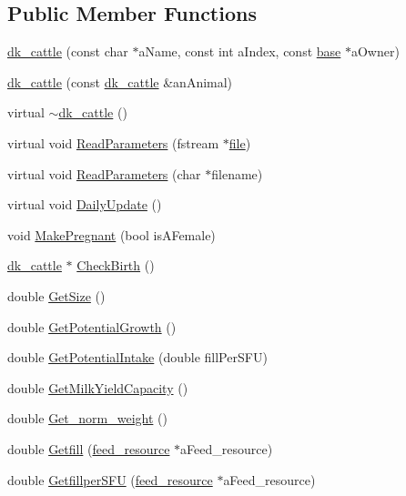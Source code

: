 \subsection*{Public Member Functions}
\begin{DoxyCompactItemize}
\item 
\hyperlink{classdk__cattle_a456fbc2e04f9a4aa1cf61824de078204}{dk\_\-cattle} (const char $\ast$aName, const int aIndex, const \hyperlink{classbase}{base} $\ast$aOwner)
\item 
\hyperlink{classdk__cattle_a4844c86db0f9abf8c884fcf503b2b984}{dk\_\-cattle} (const \hyperlink{classdk__cattle}{dk\_\-cattle} \&anAnimal)
\item 
virtual \hyperlink{classdk__cattle_a45c377e3aa07cb1c00e49797b0beefe4}{$\sim$dk\_\-cattle} ()
\item 
virtual void \hyperlink{classdk__cattle_a7b51caf022492f303671bc80780bc49c}{ReadParameters} (fstream $\ast$\hyperlink{classbase_a3af52ee9891719d09b8b19b42450b6f6}{file})
\item 
virtual void \hyperlink{classdk__cattle_a7dfcfa6feb07a5c7c1216701f60c367b}{ReadParameters} (char $\ast$filename)
\item 
virtual void \hyperlink{classdk__cattle_a33ea8994d985d00a3c0910a44e7c5d15}{DailyUpdate} ()
\item 
void \hyperlink{classdk__cattle_a015a7a7fd47f94af868165d276d26142}{MakePregnant} (bool isAFemale)
\item 
\hyperlink{classdk__cattle}{dk\_\-cattle} $\ast$ \hyperlink{classdk__cattle_af4ba40d77f7e6e452b022554793a5fd9}{CheckBirth} ()
\item 
double \hyperlink{classdk__cattle_afb8648a1b743db0ee7fb8c2cecdfaad7}{GetSize} ()
\item 
double \hyperlink{classdk__cattle_a13eb51ee37ba5528aae60b90f28f2e5e}{GetPotentialGrowth} ()
\item 
double \hyperlink{classdk__cattle_afa9e669b0e28bed057553b3ac5a8694b}{GetPotentialIntake} (double fillPerSFU)
\item 
double \hyperlink{classdk__cattle_a86a98757dfb0ead62dc410651c5ed426}{GetMilkYieldCapacity} ()
\item 
double \hyperlink{classdk__cattle_a2188892a4f9630ccb5ee58ef7fdf26b3}{Get\_\-norm\_\-weight} ()
\item 
double \hyperlink{classdk__cattle_ac50acadef7f16e7fac68bd89e6ca9836}{Getfill} (\hyperlink{classfeed__resource}{feed\_\-resource} $\ast$aFeed\_\-resource)
\item 
double \hyperlink{classdk__cattle_aa8a00543f57092882c1cbc9949ca453c}{GetfillperSFU} (\hyperlink{classfeed__resource}{feed\_\-resource} $\ast$aFeed\_\-resource)

\end{DoxyCompactItemize}
